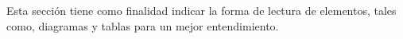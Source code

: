%

Esta sección tiene como finalidad indicar la forma de lectura de elementos, 
tales como, diagramas y tablas para un mejor entendimiento.
